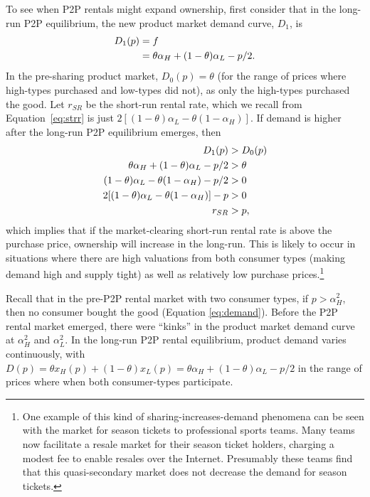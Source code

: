 \documentclass[11pt]{article}
\begin{document}
To see when P2P rentals might expand ownership, first consider that in the long-run P2P equilibrium, the new product market demand curve, $D_1$, is
\begin{align}
D_1(p) &= f \notag \\  
     &= \theta \alpha_H + (1-\theta) \alpha_L - p/2.  
\end{align} 
In the pre-sharing product market, $D_0(p) = \theta$ (for the range of prices where high-types purchased and low-types did not), as only the high-types purchased the good. 
Let $r_{SR}$ be the short-run rental rate, which we recall from Equation~\ref{eq:strr} is just $2[(1- \theta) \alpha_L - \theta(1 - \alpha_H)]$. 
If demand is higher after the long-run P2P equilibrium emerges, then  
\begin{align} 
D_{1}(p) & > D_{0}(p) \notag \\
\theta \alpha_H + (1- \theta) \alpha_L - p/2 &> \theta \notag \\
(1- \theta) \alpha_L - \theta(1 - \alpha_H) - p/2 &> 0 \notag \\
2[(1- \theta) \alpha_L - \theta(1 - \alpha_H)] - p &> 0 \notag \\
r_{SR}  &> p, 
\end{align} 
which implies that if the market-clearing short-run rental rate is above the purchase price, ownership will increase in the long-run.
This is likely to occur in situations where there are high valuations from both consumer types (making demand high and supply tight) as well as relatively low purchase prices.\footnote{ 
  One example of this kind of sharing-increases-demand phenomena can be seen with the market for season tickets to professional sports teams.
  Many teams now facilitate a resale market for their season ticket holders, charging a modest fee to enable resales over the Internet.
  Presumably these teams find that this quasi-secondary market does not decrease the demand for season tickets. 
}

Recall that in the pre-P2P rental market with two consumer types, if $p > \alpha_H^2$, then no consumer bought the good (Equation \ref{eq:demand}). 
Before the P2P rental market emerged, there were ``kinks'' in the product market demand curve at $\alpha_H^2$ and $\alpha_L^2$. 
In the long-run P2P rental equilibrium, product demand varies continuously, with $D(p) = \theta x_H(p) + (1-\theta) x_L(p) = \theta \alpha_H + (1-\theta) \alpha_L - p/2$ in the range of prices where when both consumer-types participate. 
\end{document}
